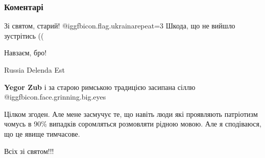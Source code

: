  
 
 
 
 
\subsubsection{Коментарі}

\begin{itemize}
 
Зі святом, старий! @igg{fbicon.flag.ukraina}{repeat=3} Шкода, що не вийшло зустрітись ((

 
Навзаєм, бро!

 
Russia Delenda Est

 
\textbf{Yegor Zub} і за старою римською традицією засипана сіллю @igg{fbicon.face.grinning.big.eyes} 

 

Цілком згоден. Але мене засмучує те, що навіть люди які проявляють патріотизм
чомусь в 90\% випадків соромляться розмовляти рідною мовою. Але я сподіваюся,
що це явище тимчасове.

Всіх зі святом!!!

\end{itemize}

